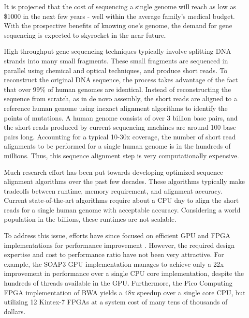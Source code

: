 \documentclass[11pt]{article}
\begin{document}
It is projected that the cost of sequencing a single genome will reach as low as \$1000 in the next few years - well within the average family’s medical budget.  With the prospective benefits of knowing one’s genome, the demand for gene sequencing is expected to skyrocket in the near future.


High throughput gene sequencing techniques typically involve splitting DNA strands into many small fragments.  These small fragments are sequenced in parallel using chemical and optical techniques, and produce short reads.  To reconstruct the original DNA sequence, the process takes advantage of the fact that over 99\% of human genomes are identical.  Instead of reconstructing the sequence from scratch, as in de novo assembly, the short reads are aligned to a reference human genome using inexact alignment algorithms to identify the points of mutations.  A human genome consists of over 3 billion base pairs, and the short reads produced by current sequencing machines are around 100 base pairs long.  Accounting for a typical 10-30x coverage, the number of short read alignments to be performed for a single human genome is in the hundreds of millions.  Thus, this sequence alignment step is very computationally expensive.


	Much research effort has been put towards developing optimized sequence alignment algorithms \cite{smith1981textordfeminineidentification, altschul1990basic, ning2001ssaha, toh2009basic, zaharia2011faster, li2009fast} over the past few decades.  These algorithms typically make tradeoffs between runtime, memory requirement, and alignment accuracy.  Current state-of-the-art algorithms require about a CPU day to align the short reads for a single human genome with acceptable accuracy.  Considering a world population in the billions, these runtimes are not scalable.


To address this issue, efforts have since focused on efficient GPU and FPGA implementations for performance improvement \cite{klus2012barracuda, liu2012soap3, okawa2012pico}.  However, the required design expertise and cost to performance ratio have not been very attractive.  For example, the SOAP3 GPU implementation manages to achieve only a 22x improvement in performance over a single CPU core implementation, despite the hundreds of threads available in the GPU.  Furthermore, the Pico Computing FPGA implementation of BWA yields a 48x speedup over a single core CPU, but utilizing 12 Kintex-7 FPGAs at a system cost of many tens of thousands of dollars.
\end{document}
